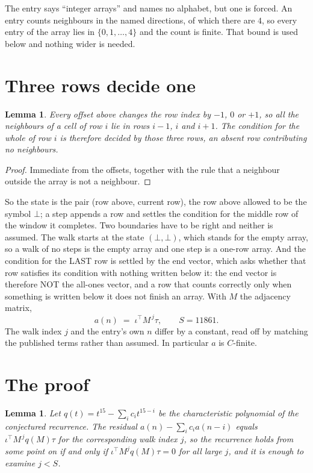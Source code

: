 \documentclass[11pt,a4paper]{article}
\theoremstyle{plain}
\newtheorem{lemma}[theorem]{Lemma}
\theoremstyle{definition}
\begin{document}
The entry says ``integer arrays'' and names no alphabet, but one is forced. An entry counts
neighbours in the named directions, of which there are $4$, so every entry of the array
lies in $\{0,1,\dots,4\}$ and the count is finite. That bound is used below and
nothing wider is needed.

\section{Three rows decide one}

\begin{lemma}\label{lem:win}
Every offset above changes the row index by $-1$, $0$ or $+1$, so all the neighbours of a cell
of row $i$ lie in rows $i-1$, $i$ and $i+1$. The condition for the whole of row $i$ is
therefore decided by those three rows, an absent row contributing no neighbours.
\end{lemma}

\begin{proof}
Immediate from the offsets, together with the rule that a neighbour outside the array is not a
neighbour.
\end{proof}

So the state is the pair (row above, current row), the row above allowed to be the symbol
$\bot$; a step appends a row and settles the condition for the middle row of the window it
completes. Two boundaries have to be right and neither is assumed. The walk starts at the state
$(\bot,\bot)$, which stands for the empty array, so a walk of no steps is the empty array and
one step is a one-row array. And the condition for the LAST row is settled by the end vector,
which asks whether that row satisfies its condition with nothing written below it: the end
vector is therefore NOT the all-ones vector, and a row that counts correctly only when
something is written below it does not finish an array. With $M$ the adjacency matrix,
\[
a(n)\;=\;\iota^{\!\top}M^{\,j}\tau ,\qquad S=11861.
\]
The walk index $j$ and the entry's own $n$ differ by a constant, read off by matching the
published terms rather than assumed. In particular $a$ is $C$-finite.

\section{The proof}

\begin{lemma}\label{lem:crit}
Let $q(t)=t^{15}-\sum_i c_it^{15-i}$ be the characteristic polynomial of the
conjectured recurrence. The residual $a(n)-\sum_ic_ia(n-i)$ equals
$\iota^{\!\top}M^{\,j}q(M)\tau$ for the corresponding walk index $j$, so the recurrence
holds from some point on if and only if $\iota^{\!\top}M^{j}q(M)\tau=0$ for all large $j$,
and it is enough to examine $j<S$.
\end{lemma}
\end{document}
